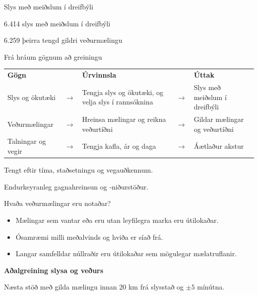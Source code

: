 \documentclass[aspectratio=169,12pt,t]{beamer}
\begin{document}
\begin{frame}{Slys með meiðslum í dreifbýli}
\relax
{}
{\small 6.414 slys með meiðslum í dreifbýli\par
6.259 þeirra tengd gildri veðurmælingu\par}
\end{frame}

\begin{frame}{Frá hráum gögnum að greiningu}
\relax
{\small\renewcommand{\arraystretch}{1.3}
\begin{tabular}{@{}>{\raggedright\arraybackslash}p{3.3cm}c>{\raggedright\arraybackslash}p{4.0cm}c>{\raggedright\arraybackslash}p{4.2cm}@{}}
\textbf{Gögn} && \textbf{Úrvinnsla} && \textbf{Úttak}\\
Slys og ökutæki & $\to$ & Tengja slys og ökutæki, og velja slys í rannsóknina & $\to$ & Slys með meiðslum í dreifbýli\\
Veðurmælingar & $\to$ & Hreinsa mælingar og reikna veðurtíðni & $\to$ & Gildar mælingar og veðurtíðni\\
Talningar og vegir & $\to$ & Tengja kafla, ár og daga & $\to$ & Áætlaður akstur\\
\end{tabular}\par}
\vspace{4mm}
Tengt eftir tíma, staðsetningu og vegauðkennum.\par
Endurkeyranleg gagnahreinsun og  -niðurstöður.
\end{frame}

\begin{frame}{Hvaða veðurmælingar eru notaðar?}
\relax
\begin{itemize}\points
\item Mælingar sem vantar eða eru utan leyfilegra marka eru útilokaðar.
\item Ósamræmi milli meðalvinds og hviða er síað frá.
\item Langar samfelldar núllraðir eru útilokaðar sem mögulegar mælatruflanir.
\end{itemize}
\vspace{3mm}
\textbf{Aðalgreining slysa og veðurs}\par
Næsta stöð með gilda mælingu innan 20 km frá slysstað og $\pm5$ mínútna.
\end{frame}
\end{document}
